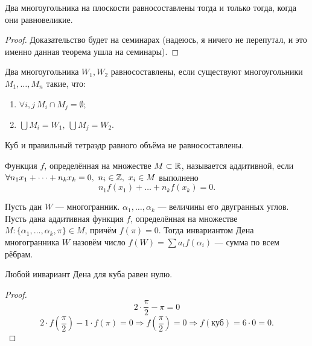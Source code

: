 \begin{theorem}
    Два многоугольника на плоскости равносоставлены тогда и только тогда, когда они равновеликие.
\end{theorem}
\begin{proof}
    Доказательство будет на семинарах (надеюсь, я ничего не перепутал, и это именно данная теорема ушла на семинары).
\end{proof}

\begin{definition}
    Два многоугольника $W_1, W_2$ равносоставлены, если существуют многоугольники $M_1, \dots, M_n$ такие, что:
    \begin{enumerate}
        \item $\forall i, j \ M_i \cap M_j = \emptyset$;
        \item $\bigcup M_i = W_1, \ \bigcup M_j = W_2$.
    \end{enumerate} 
\end{definition}

\begin{theorem}[Ден]
    Куб и правильный тетраэдр равного объёма не равносоставлены.
\end{theorem}

\begin{definition}
    Функция $f$, определённая на множестве $M \subset \mathbb{R}$, называется аддитивной, если $\forall n_1 x_1 + \dots + n_k x_k = 0, \ n_i \in \mathbb{Z}, \ x_i \in M$ выполнено $$n_1 f(x_1) + \dots + n_k f(x_k) = 0.$$ 
\end{definition}

\begin{definition}
    Пусть дан $W$ — многогранник. $\alpha_1, \dots, \alpha_k$ — величины его двугранных углов. Пусть дана аддитивная функция $f$, определённая на множестве $M: \{\alpha_1, \dots, \alpha_k, \pi\} \in M$, причём $f(\pi) = 0$. Тогда инвариантом Дена многогранника $W$ назовём число $f(W) = \sum a_i f(\alpha_i)$ — сумма по всем рёбрам.
\end{definition}

\begin{statement}
    Любой инвариант Дена для куба равен нулю.
\end{statement}
\begin{proof}
    $$2 \cdot \frac{\pi}{2} - \pi = 0$$
    $$2 \cdot f \left(\frac{\pi}2\right) - 1 \cdot f(\pi) = 0 \Rightarrow f \left(\frac{\pi}2\right) = 0 \Rightarrow f(\text{куб}) = 6 \cdot 0 = 0.$$
\end{proof}

